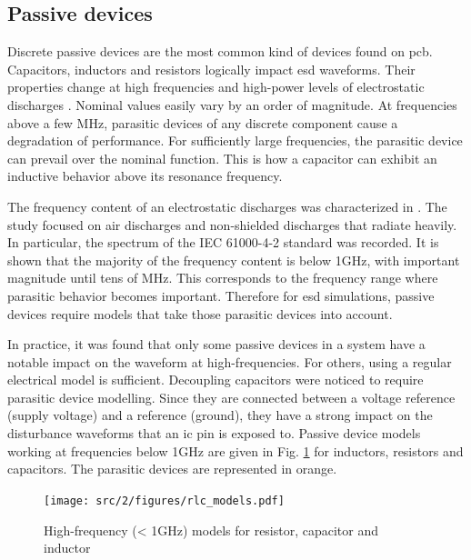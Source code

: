 \subsection{Passive devices}

Discrete passive devices are the most common kind of devices found on \gls{pcb}.
Capacitors, inductors and resistors logically impact \gls{esd} waveforms.
Their properties change at high frequencies and high-power levels of electrostatic discharges \cite{capa-esd-cz}.
Nominal values easily vary by an order of magnitude.
At frequencies above a few MHz, parasitic devices of any discrete component cause a degradation of performance.
For sufficiently large frequencies, the parasitic device can prevail over the nominal function.
This is how a capacitor can exhibit an inductive behavior above its resonance frequency.

The frequency content of an electrostatic discharges was characterized in \cite{fft-esd}.
The study focused on air discharges and non-shielded discharges that radiate heavily.
In particular, the spectrum of the IEC 61000-4-2 standard \cite{iec61000-4-2} was recorded.
It is shown that the majority of the frequency content is below 1GHz, with important magnitude until tens of MHz.
This corresponds to the frequency range where parasitic behavior becomes important.
Therefore for \gls{esd} simulations, passive devices require models that take those parasitic devices into account.

In practice, it was found that only some passive devices in a system have a notable impact on the waveform at high-frequencies.
For others, using a regular electrical model is sufficient.
Decoupling capacitors were noticed to require parasitic device modelling.
Since they are connected between a voltage reference (supply voltage) and a reference (ground), they have a strong impact on the disturbance waveforms that an \gls{ic} pin is exposed to.
Passive device models working at frequencies below 1GHz are given in Fig. \ref{fig:rlc-esd-models} for inductors, resistors and capacitors.
The parasitic devices are represented in orange.

\begin{figure}[!h]
  \centering
  \texttt{[image: src/2/figures/rlc\_models.pdf]}
  \caption{High-frequency (< 1GHz) models for resistor, capacitor and inductor}
  \label{fig:rlc-esd-models}
\end{figure}

